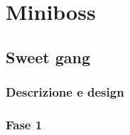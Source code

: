 \section{Miniboss}

    \subsection{Sweet gang}
    
        \subsubsection{Descrizione e design}
        
        \subsubsection{Fase 1}
